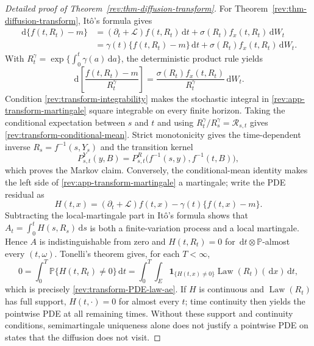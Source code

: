 \documentclass[11pt]{article}
\theoremstyle{remark}
\newcommand{\Pp}{\mathbb P}
\newcommand{\dd}{\,\mathrm d}
\newcommand{\Law}{\operatorname{Law}}
\newcommand{\one}{\mathbf 1}
\begin{document}
\begin{proof}[Detailed proof of Theorem~\ref{rev:thm-diffusion-transform}]
For Theorem~\ref{rev:thm-diffusion-transform}, It\^o's formula gives
\begin{align*}
\dd\{f(t,R_t)-m\}
&=(\partial_t+\mathcal L)f(t,R_t)\dd t
  +\sigma(R_t)f_x(t,R_t)\dd W_t\\
&=\gamma(t)\{f(t,R_t)-m\}\dd t
  +\sigma(R_t)f_x(t,R_t)\dd W_t.
\end{align*}
With $R_t^\gamma=\exp\{\int_0^t\gamma(a)\dd a\}$, the deterministic product
rule yields
\begin{equation}
\dd\!\left[\frac{f(t,R_t)-m}{R_t^\gamma}\right]
=\frac{\sigma(R_t)f_x(t,R_t)}{R_t^\gamma}\dd W_t.
\label{rev:app-transform-martingale}
\end{equation}
Condition \eqref{rev:transform-integrability} makes the stochastic integral in
\eqref{rev:app-transform-martingale} square integrable on every finite
horizon.  Taking the conditional expectation between $s$ and $t$ and using
$R_t^\gamma/R_s^\gamma=\mathcal R_{s,t}$ gives
\eqref{rev:transform-conditional-mean}.  Strict monotonicity gives the
time-dependent inverse $R_s=f^{-1}(s,Y_s)$ and the transition kernel
\[
P^Y_{s,t}(y,B)
=P^R_{s,t}\bigl(f^{-1}(s,y),f^{-1}(t,B)\bigr),
\]
which proves the Markov claim.  Conversely, the conditional-mean identity
makes the left side of \eqref{rev:app-transform-martingale} a martingale;
write the PDE residual as
\[
 H(t,x)=(\partial_t+\mathcal L)f(t,x)
       -\gamma(t)\{f(t,x)-m\}.
\]
Subtracting the local-martingale part in It\^o's formula shows that
$A_t=\int_0^tH(s,R_s)\dd s$ is both a finite-variation process and a local
martingale.  Hence $A$ is indistinguishable from zero and
$H(t,R_t)=0$ for $\dd t\otimes\Pp$-almost every $(t,\omega)$.  Tonelli's
theorem gives, for each $T<\infty$,
\[
 0=\int_0^T\Pp\{H(t,R_t)\ne0\}\dd t
  =\int_0^T\int_E\one_{\{H(t,x)\ne0\}}
       \Law(R_t)(\dd x)\dd t,
\]
which is precisely \eqref{rev:transform-PDE-law-ae}.  If $H$ is continuous
and $\Law(R_t)$ has full support, $H(t,\cdot)=0$ for almost every $t$; time
continuity then yields the pointwise PDE at all remaining times.  Without
these support and continuity conditions, semimartingale uniqueness alone does
not justify a pointwise PDE on states that the diffusion does not visit.
\end{proof}
\end{document}
